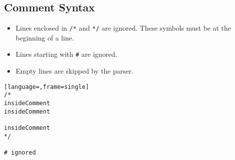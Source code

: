 \documentclass[12pt,a4paper]{report}
\begin{document}
\subsection*{Comment Syntax}

\begin{itemize}
  \item Lines enclosed in \texttt{/*} and \texttt{*/} are ignored. These symbols must be at the beginning of a line.
  \item Lines starting with \texttt{\#} are ignored.
  \item Empty lines are skipped by the parser.
\end{itemize}

\begin{lstlisting}[language=,frame=single]
/*
insideComment
insideComment

insideComment
*/

# ignored
\end{lstlisting}
\end{document}

